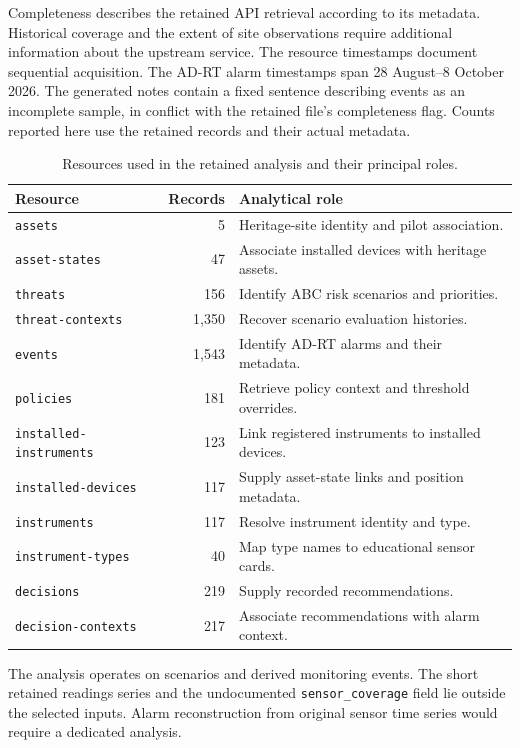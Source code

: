 \documentclass[10pt,a4paper]{article}
\begin{document}
Completeness describes the retained API retrieval according to its metadata. Historical coverage and the extent of site observations require additional information about the upstream service. The resource timestamps document sequential acquisition. The AD-RT alarm timestamps span 28 August--8 October 2026. The generated notes contain a fixed sentence describing events as an incomplete sample, in conflict with the retained file's completeness flag. Counts reported here use the retained records and their actual metadata.

\begin{table}[htbp]
\centering\small
\caption{Resources used in the retained analysis and their principal roles.}\label{tab:inputs}
\begin{tabularx}{\linewidth}{@{}p{3.6cm}rY@{}}
\toprule Resource & Records & Analytical role\\\midrule
\texttt{assets} & 5 & Heritage-site identity and pilot association.\\
\texttt{asset-states} & 47 & Associate installed devices with heritage assets.\\
\texttt{threats} & 156 & Identify ABC risk scenarios and priorities.\\
\texttt{threat-contexts} & 1,350 & Recover scenario evaluation histories.\\
\texttt{events} & 1,543 & Identify AD-RT alarms and their metadata.\\
\texttt{policies} & 181 & Retrieve policy context and threshold overrides.\\
\texttt{installed-instruments} & 123 & Link registered instruments to installed devices.\\
\texttt{installed-devices} & 117 & Supply asset-state links and position metadata.\\
\texttt{instruments} & 117 & Resolve instrument identity and type.\\
\texttt{instrument-types} & 40 & Map type names to educational sensor cards.\\
\texttt{decisions} & 219 & Supply recorded recommendations.\\
\texttt{decision-contexts} & 217 & Associate recommendations with alarm context.\\
\bottomrule
\end{tabularx}
\end{table}

The analysis operates on scenarios and derived monitoring events. The short retained readings series and the undocumented \texttt{sensor\_coverage} field lie outside the selected inputs. Alarm reconstruction from original sensor time series would require a dedicated analysis.
\end{document}

